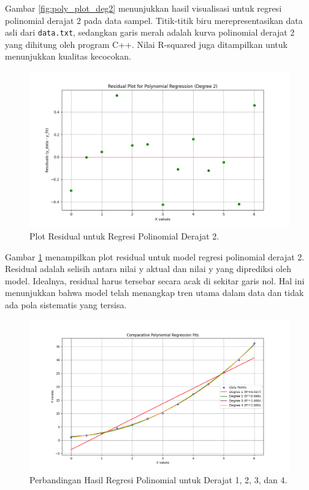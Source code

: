 \documentclass[conference]{IEEEtran}
\begin{document}
Gambar \ref{fig:poly_plot_deg2} menunjukkan hasil visualisasi untuk regresi polinomial derajat 2 pada data sampel. Titik-titik biru merepresentasikan data asli dari \texttt{data.txt}, sedangkan garis merah adalah kurva polinomial derajat 2 yang dihitung oleh program C++. Nilai R-squared juga ditampilkan untuk menunjukkan kualitas kecocokan.

\begin{figure}[htbp]
\centerline{\includegraphics[width=0.9\columnwidth]{polynomial_regression_residuals_deg2.png}}
\caption{Plot Residual untuk Regresi Polinomial Derajat 2.}
\label{fig:residuals_deg2}
\end{figure}

Gambar \ref{fig:residuals_deg2} menampilkan plot residual untuk model regresi polinomial derajat 2. Residual adalah selisih antara nilai y aktual dan nilai y yang diprediksi oleh model. Idealnya, residual harus tersebar secara acak di sekitar garis nol. Hal ini menunjukkan bahwa model telah menangkap tren utama dalam data dan tidak ada pola sistematis yang tersisa.

\begin{figure}[htbp]
\centerline{\includegraphics[width=0.9\columnwidth]{polynomial_regression_comparative_deg1_2_3_4.png}}
\caption{Perbandingan Hasil Regresi Polinomial untuk Derajat 1, 2, 3, dan 4.}
\label{fig:comparative_plot}
\end{figure}
\end{document}
